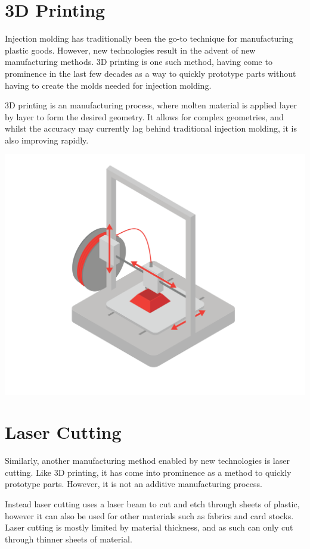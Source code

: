 
\section{3D Printing}

Injection molding has traditionally been the go-to technique for manufacturing plastic goods. However, new technologies result in the advent of new manufacturing methods. 3D printing is one such method, having come to prominence in the last few decades as a way to quickly prototype parts without having to create the molds needed for injection molding.

3D printing is an  manufacturing process, where molten material is applied layer by layer to form the desired geometry. It allows for complex geometries, and whilst the accuracy may currently lag behind traditional injection molding, it is also improving rapidly.

\includegraphics[width=.75\textwidth]{3dprinter.png}


\section{Laser Cutting}

Similarly, another manufacturing method enabled by new technologies is laser cutting. Like 3D printing, it has come into prominence as a method to quickly prototype parts. However, it is not an additive manufacturing process.

Instead laser cutting uses a laser beam to cut and etch through sheets of plastic, however it can also be used for other materials such as fabrics and card stocks. Laser cutting is mostly limited by material thickness, and as such can only cut through thinner sheets of material.

